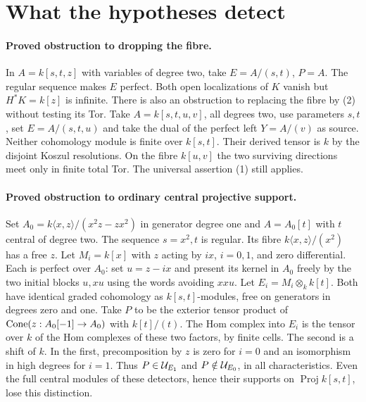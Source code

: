 \documentclass[11pt]{article}
\begin{document}
\section{What the hypotheses detect}
\paragraph{Proved obstruction to dropping the fibre.}
In $A=k[s,t,z]$ with variables of degree two, take
$E=A/(s,t)$, $P=A$. The regular sequence makes $E$ perfect. Both open
localizations of $K$ vanish but $H^*K=k[z]$ is infinite.
There is also an obstruction to replacing the fibre by (2) without
testing its Tor. Take $A=k[s,t,u,v]$, all degrees two, use parameters
$s,t$, set $E=A/(s,t,u)$ and take the dual of the perfect left
$Y=A/(v)$ as source. Neither cohomology module is finite over $k[s,t]$.
Their derived tensor is $k$ by the disjoint Koszul resolutions. On the
fibre $k[u,v]$ the two surviving directions meet only in finite total
Tor. The universal assertion (1) still applies.

\paragraph{Proved obstruction to ordinary central projective support.}
Set $A_0=k\langle x,z\rangle/(x^2z-zx^2)$ in generator degree one and
$A=A_0[t]$ with $t$ central of degree two. The sequence $s=x^2,t$
is regular. Its fibre $k\langle x,z\rangle/(x^2)$ has a free $z$.
Let $M_i=k[x]$ with $z$ acting by $i x$, $i=0,1$, and zero
differential. Each is perfect over $A_0$: set $u=z-i x$ and present
its kernel in $A_0$ freely by the two initial blocks $u,xu$ using
the words avoiding $xxu$. Let $E_i=M_i\otimes_k k[t]$. Both have
identical graded cohomology as $k[s,t]$-modules, free on generators in
degrees zero and one. Take $P$ to be the exterior tensor product of
$\operatorname{Cone}(z:A_0[-1]\to A_0)$ with $k[t]/(t)$. The Hom complex into $E_i$
is the tensor over $k$ of the Hom complexes of these two factors,
by finite cells. The second is a shift of $k$. In the first, precomposition
by $z$ is zero for $i=0$ and an isomorphism in high degrees for $i=1$.
Thus $P\in\mathcal U_{E_1}$ and $P\notin\mathcal U_{E_0}$, in all characteristics.
Even the full central modules of these detectors, hence their supports
on $\operatorname{Proj} k[s,t]$, lose this distinction.
\end{document}

